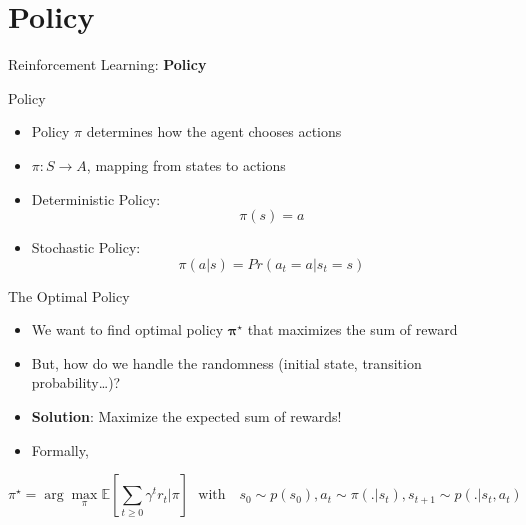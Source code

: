 \section{Policy}
\begin{frame}{}
    \LARGE Reinforcement Learning: \textbf{Policy}
\end{frame}

\begin{frame}{Policy}
\begin{itemize}
    \item Policy $\pi$ determines how the agent chooses actions
    \item $\pi : S \rightarrow A$, mapping from states to actions
    \item Deterministic Policy: $$\pi(s) = a$$
    \item Stochastic Policy: $$\pi(a|s) = Pr(a_t = a | s_t = s)$$
\end{itemize}
    
\end{frame}

\begin{frame}{The Optimal Policy}
\begin{itemize}
    \item We want to find optimal policy $\bm{\pi^{\star}}$ that maximizes the sum of reward
    \item But, how do we handle the randomness (initial state, transition probability…)?
    \pause
    \item \textbf{Solution}: Maximize the expected sum of rewards!
    \item Formally,
\end{itemize}
    $$\pi^{\star} = \arg \max_{\pi} \mathbb{E} \left [ \sum_{t \geq 0} \gamma^t r_t | \pi \right ] \:\:\: \text{with } \:\:\: s_0 \sim p(s_0), a_t \sim \pi(.|s_t), s_{t+1} \sim p(.|s_t, a_t)$$
\end{frame}